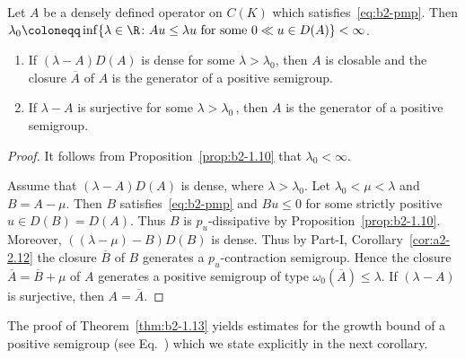 \begin{theorem}\label{thm:b2-1.13}
Let $A$ be a densely defined operator on $C(K)$ which satisfies~\eqref{eq:b2-pmp}.
Then
$
    \lambda_{0} \coloneqq \inf\{\lambda \in \R \colon Au \leq \lambda u \text{ for some } 0 \ll u \in D(A)\} < \infty
$.
\begin{enumerate}[\upshape (i)]
\item \label{thm:b2-1.13-1}
If\/ $(\lambda - A)D(A)$ is dense for some $\lambda > \lambda_{0}$, then $A$ is closable and the closure $\overline{A}$ of\/ $A$ is the generator of a positive semigroup.

\item \label{thm:b2-1.13-2}
If\/ $\lambda - A$ is surjective for some $\lambda > \lambda_{0}$\,, then $A$ is the generator of a positive semigroup.
\end{enumerate}
\end{theorem}
\begin{proof}
It follows from Proposition~\ref{prop:b2-1.10} that $\lambda_{0} < \infty$.

Assume that $(\lambda - A)D(A)$ is dense, where $\lambda > \lambda_{0}$.
Let $\lambda_{0} < \mu < \lambda$ and $B = A - \mu$.
Then $B$ satisfies~\eqref{eq:b2-pmp} and $Bu \leq 0$ for some strictly positive $u \in D(B) = D(A)$.
Thus $B$ is $p_{u}$-dissipative by Proposition~\ref{prop:b2-1.10}.
Moreover, $((\lambda-\mu) - B)D(B)$ is dense.
Thus by Part-I, Corollary~\ref{cor:a2-2.12} 
the closure $\overline{B}$ of\/ $B$ generates a $p_{u}$-contraction semigroup.
Hence the
closure $\overline{A} = \overline{B} + \mu$ of\/ $A$ generates a positive semigroup of type $\omega_{0}(\overline{A}) \leq \lambda$.
If\/ $(\lambda - A)$ is surjective, then $A = \overline{A}$.
\end{proof}
The proof of Theorem~\ref{thm:b2-1.13} yields estimates for the growth bound of a positive semigroup (see Eq.~) which we state explicitly in the next corollary.

